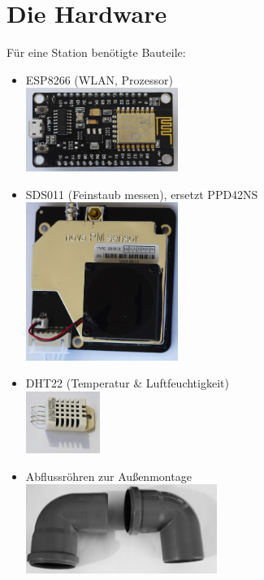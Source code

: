 \documentclass[
notumble,
]{leaflet}
\begin{document}
\section{Die Hardware}

Für eine Station benötigte Bauteile:
\begin{itemize}
\item ESP8266 (WLAN, Prozessor) \\\includegraphics[width=0.39\textwidth]{images/sensor/esp8266.jpg} 
\item SDS011 (Feinstaub messen), ersetzt PPD42NS \\\includegraphics[width=0.39\textwidth]{images/sensor/sds011.jpg} 
\item DHT22 (Temperatur \& Luftfeuchtigkeit)\\\includegraphics[width=0.19\textwidth,angle=0]{images/sensor/DHT22.jpg}
\item Abflussröhren zur Außenmontage \\\includegraphics[width=0.49\textwidth]{images/sensor/twotubes.jpg} 

\end{itemize}
\end{document}
